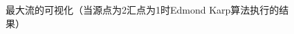 \setlength{\belowcaptionskip}{-1pt}
\vspace{-7pt}
\begin{figure}[!htbp]
  \centering
  \vspace{-5pt}
  \caption{最大流的可视化（当源点为2汇点为1时Edmond Karp算法执行的结果）}
  \label{fig:8}
\end{figure}
